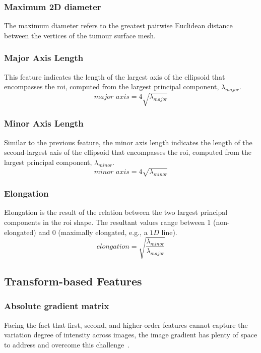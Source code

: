 \subsubsection*{Maximum 2D diameter}
The maximum diameter refers to the greatest pairwise Euclidean distance between the vertices of the tumour surface mesh.

\subsubsection*{Major Axis Length}
This feature indicates the length of the largest axis of the ellipsoid that encompasses the \ac{roi}, computed from the largest principal component, $\lambda_{major}$.
\begin{equation}
    \textit{major axis} = 4 \sqrt{\lambda_{major}}
\end{equation}

\subsubsection*{Minor Axis Length}
Similar to the previous feature, the minor axis length indicates the length of the second-largest axis of the ellipsoid that encompasses the \ac{roi}, computed from the largest principal component, $\lambda_{minor}$.
\begin{equation}
     \textit{minor axis} = 4 \sqrt{\lambda_{minor}}
\end{equation}

\subsubsection*{Elongation}
Elongation is the result of the relation between the two largest principal components in the \ac{roi} shape. The resultant values range between 1 (non-elongated) and 0 (maximally elongated, e.g., a $1D$ line).
\begin{equation}
    \textit{elongation} = \sqrt{\frac{\lambda_{minor}}{\lambda_{major}}}
\end{equation}



\subsection{Transform-based Features}

\subsubsection{Absolute gradient matrix}
Facing the fact that first, second, and higher-order features cannot capture the variation degree of intensity across images, the image gradient has plenty of space to address and overcome this challenge~\cite{abbasian_ardakani_interpretation_2022}.

